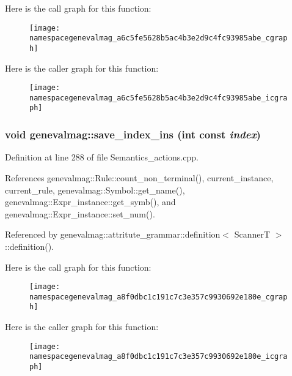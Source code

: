 Here is the call graph for this function:\nopagebreak
\begin{figure}[H]
\begin{center}
\leavevmode
\texttt{[image: namespacegenevalmag\_a6c5fe5628b5ac4b3e2d9c4fc93985abe\_cgraph]}
\end{center}
\end{figure}




Here is the caller graph for this function:\nopagebreak
\begin{figure}[H]
\begin{center}
\leavevmode
\texttt{[image: namespacegenevalmag\_a6c5fe5628b5ac4b3e2d9c4fc93985abe\_icgraph]}
\end{center}
\end{figure}


\hypertarget{namespacegenevalmag_a8f0dbc1c191c7c3e357c9930692e180e}{
\subsubsection[{save\_\-index\_\-ins}]{\setlength{\rightskip}{0pt plus 5cm}void genevalmag::save\_\-index\_\-ins (int const  {\em index})}}
\label{namespacegenevalmag_a8f0dbc1c191c7c3e357c9930692e180e}


Definition at line 288 of file Semantics\_\-actions.cpp.



References genevalmag::Rule::count\_\-non\_\-terminal(), current\_\-instance, current\_\-rule, genevalmag::Symbol::get\_\-name(), genevalmag::Expr\_\-instance::get\_\-symb(), and genevalmag::Expr\_\-instance::set\_\-num().



Referenced by genevalmag::attritute\_\-grammar::definition$<$ ScannerT $>$::definition().



Here is the call graph for this function:\nopagebreak
\begin{figure}[H]
\begin{center}
\leavevmode
\texttt{[image: namespacegenevalmag\_a8f0dbc1c191c7c3e357c9930692e180e\_cgraph]}
\end{center}
\end{figure}




Here is the caller graph for this function:\nopagebreak
\begin{figure}[H]
\begin{center}
\leavevmode
\texttt{[image: namespacegenevalmag\_a8f0dbc1c191c7c3e357c9930692e180e\_icgraph]}
\end{center}
\end{figure}


